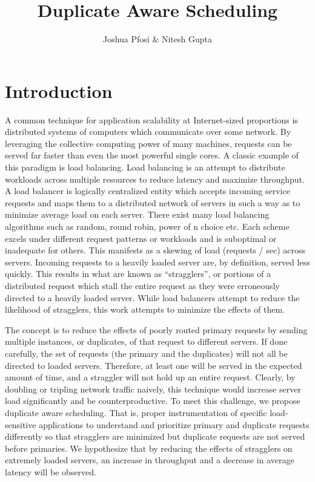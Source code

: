 \documentclass[11pt,titlepage]{article}
\title{Duplicate Aware Scheduling}
\author{Joshua Pfosi \& Nitesh Gupta}
\date{}
\begin{document}
\maketitle

\tableofcontents
\listoffigures
\listoftables

\pagebreak

\maketitle

\section{Introduction}

A common technique for application scalability at Internet-sized proportions is
distributed systems of computers which communicate over some network. By
leveraging the collective computing power of many machines, requests can be
served far faster than even the most powerful single cores. A classic example of
this paradigm is load balancing. Load balancing is an attempt to distribute
workloads across multiple resources to reduce latency and maximize throughput. A
load balancer is logically centralized entity which accepts incoming service
requests and maps them to a distributed network of servers in such a way as to
minimize average load on each server. There exist many load balancing algorithms
such as random, round robin, power of n choice etc. Each scheme excels under
different request patterns or workloads and is suboptimal or inadequate for
others. This manifests as a skewing of load (requests / sec) across servers.
Incoming requests to a heavily loaded server are, by definition, served less
quickly. This results in what are known as “stragglers”, or portions of a
distributed request which stall the entire request as they were erroneously
directed to a heavily loaded server. While load balancers attempt to reduce the
likelihood of stragglers, this work attempts to minimize the effects of them.

The concept is to reduce the effects of poorly routed primary requests by
sending multiple instances, or duplicates, of that request to different servers.
If done carefully, the set of requests (the primary and the duplicates) will not
all be directed to loaded servers. Therefore, at least one will be served in the
expected amount of time, and a straggler will not hold up an entire request.
Clearly, by doubling or tripling network traffic naively, this technique would
increase server load significantly and be counterproductive. To meet this
challenge, we propose duplicate aware scheduling. That is, proper
instrumentation of specific load-sensitive applications to understand and
prioritize primary and duplicate requests differently so that stragglers are
minimized but duplicate requests are not served before primaries. We hypothesize
that by reducing the effects of stragglers on extremely loaded servers, an
increase in throughput and a decrease in average latency will be observed.
\end{document}
